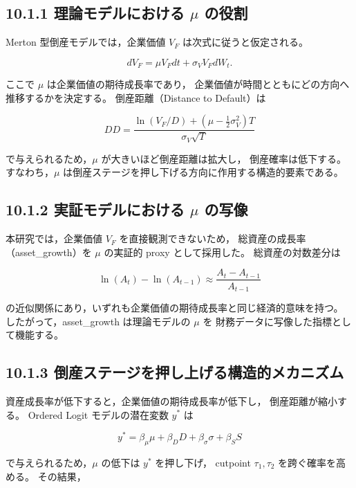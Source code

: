 \subsection*{10.1.1 理論モデルにおける $\mu$ の役割}

Merton 型倒産モデルでは，企業価値 $V_F$ は次式に従うと仮定される。



\[
dV_F = \mu V_F dt + \sigma_V V_F dW_t.
\]



ここで $\mu$ は企業価値の期待成長率であり，
企業価値が時間とともにどの方向へ推移するかを決定する。
倒産距離（Distance to Default）は



\[
DD = \frac{\ln(V_F/D) + (\mu - \frac{1}{2}\sigma_V^2)T}{\sigma_V\sqrt{T}}
\]



で与えられるため，$\mu$ が大きいほど倒産距離は拡大し，
倒産確率は低下する。
すなわち，$\mu$ は倒産ステージを押し下げる方向に作用する構造的要素である。

\subsection*{10.1.2 実証モデルにおける $\mu$ の写像}

本研究では，企業価値 $V_F$ を直接観測できないため，
総資産の成長率（asset\_growth）を $\mu$ の実証的 proxy として採用した。
総資産の対数差分は



\[
\ln(A_t) - \ln(A_{t-1}) \approx \frac{A_t - A_{t-1}}{A_{t-1}}
\]



の近似関係にあり，いずれも企業価値の期待成長率と同じ経済的意味を持つ。
したがって，asset\_growth は理論モデルの $\mu$ を
財務データに写像した指標として機能する。

\subsection*{10.1.3 倒産ステージを押し上げる構造的メカニズム}

資産成長率が低下すると，企業価値の期待成長率が低下し，
倒産距離が縮小する。
Ordered Logit モデルの潜在変数 $y^*$ は



\[
y^* = \beta_\mu \mu + \beta_D D + \beta_\sigma \sigma + \beta_S S
\]



で与えられるため，$\mu$ の低下は $y^*$ を押し下げ，
cutpoint $\tau_1, \tau_2$ を跨ぐ確率を高める。
その結果，

